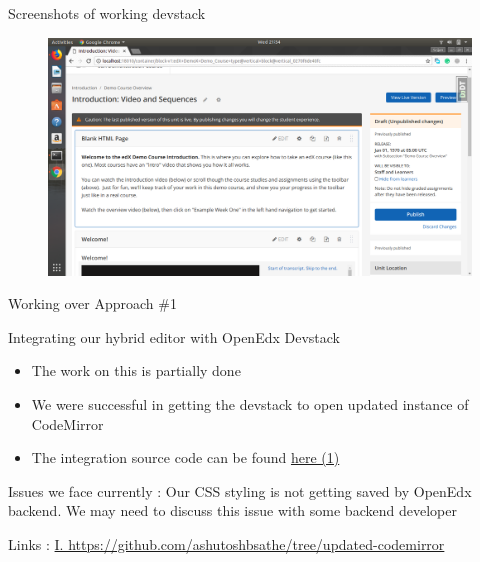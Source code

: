 \documentclass{beamer}
\begin{document}
	\begin{frame}{Screenshots of working devstack}
		\begin{figure}
			\includegraphics[width=\linewidth,height=\textheight,keepaspectratio]{./18-06-18/devstack-4.png}
		\end{figure}
	\end{frame}
	
	\begin{frame}{Working over Approach \#1}
		\begin{block}{Integrating our hybrid editor with OpenEdx Devstack}
			\begin{itemize}
				\item The work on this is partially done
				\item We were successful in getting the devstack to open updated instance of CodeMirror
				\item The integration source code can be found \alert{\href{https://github.com/ashutoshbsathe/tree/updated-codemirror}{here (1)}}
			\end{itemize}
		\end{block}
		\begin{block}{Issues we face currently :}
			Our CSS styling is not getting saved by OpenEdx backend. We may need to discuss this issue with some backend developer
		\end{block}
		\begin{block}{Links :}
		\tiny{\href{https://github.com/ashutoshbsathe/tree/updated-codemirror}{I. https://github.com/ashutoshbsathe/tree/updated-codemirror}}
		\end{block}
	\end{frame}
	
\end{document}
